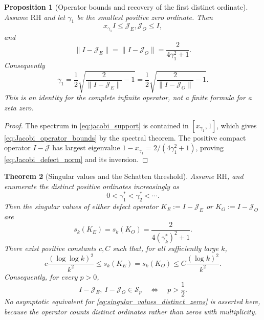\documentclass[11pt]{amsart}
\numberwithin{equation}{section}
\theoremstyle{plain}
\newtheorem{theorem}{Theorem}[section]
\newtheorem{proposition}[theorem]{Proposition}
\theoremstyle{definition}
\theoremstyle{remark}
\newcommand{\RH}{\mathrm{RH}}
\begin{document}
\begin{proposition}[Operator bounds and recovery of the first distinct ordinate]
\label{prop:operator_bounds_first_zero}
Assume $\RH$ and let $\gamma_1$ be the smallest positive zero ordinate.  Then
\begin{equation}
x_{\gamma_1}I\le \mathcal J_E,\mathcal J_O\le I,
\label{eq:Jacobi_operator_bounds}
\end{equation}
and
\begin{equation}
\|I-\mathcal J_E\|
=\|I-\mathcal J_O\|
=\frac{2}{4\gamma_1^2+1}.
\label{eq:Jacobi_defect_norm}
\end{equation}
Consequently
\begin{equation}
\gamma_1
=\frac12\sqrt{\frac{2}{\|I-\mathcal J_E\|}-1}
=\frac12\sqrt{\frac{2}{\|I-\mathcal J_O\|}-1}.
\label{eq:first_zero_from_infinite_operator_norm}
\end{equation}
This is an identity for the complete infinite operator, not a finite formula for a zeta zero.
\end{proposition}

\begin{proof}
The spectrum in \eqref{eq:jacobi_support} is contained in $[x_{\gamma_1},1]$, which gives \eqref{eq:Jacobi_operator_bounds} by the spectral theorem.  The positive compact operator $I-\mathcal J$ has largest eigenvalue $1-x_{\gamma_1}=2/(4\gamma_1^2+1)$, proving \eqref{eq:Jacobi_defect_norm} and its inversion.
\end{proof}

\begin{theorem}[Singular values and the Schatten threshold]
\label{thm:Schatten_threshold}
Assume $\RH$, and enumerate the \emph{distinct} positive ordinates increasingly as
\begin{equation}
0<\gamma_1^*<\gamma_2^*<\cdots.
\label{eq:distinct_ordinate_enumeration}
\end{equation}
Then the singular values of either defect operator $K_E:=I-\mathcal J_E$ or $K_O:=I-\mathcal J_O$ are
\begin{equation}
s_k(K_E)=s_k(K_O)
=\frac{2}{4(\gamma_k^*)^2+1}.
\label{eq:singular_values_distinct_zeros}
\end{equation}
There exist positive constants $c,C$ such that, for all sufficiently large $k$,
\begin{equation}
c\frac{(\log\log k)^2}{k^2}
\le s_k(K_E)=s_k(K_O)
\le C\frac{(\log k)^2}{k^2}.
\label{eq:singular_value_two_sided_bounds}
\end{equation}
Consequently, for every $p>0$,
\begin{equation}
I-\mathcal J_E,\ I-\mathcal J_O\in\mathcal S_p
\quad\Longleftrightarrow\quad
p>\frac12.
\label{eq:Schatten_threshold}
\end{equation}
No asymptotic equivalent for \eqref{eq:singular_values_distinct_zeros} is asserted here, because the operator counts distinct ordinates rather than zeros with multiplicity.
\end{theorem}
\end{document}
